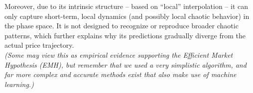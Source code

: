 \begin{itemize}
   Moreover, due to its intrinsic structure -- based on “local” interpolation -- it can only capture short-term, local dynamics (and possibly local chaotic behavior) in the phase space. It is not designed to recognize or reproduce broader chaotic patterns, which further explains why its predictions gradually diverge from the actual price trajectory.\\
   
    \textit{(Some may view this as empirical evidence supporting the Efficient Market Hypothesis (EMH), but remember that we used a very simplistic algorithm, and far more complex and accurate methods exist that also make use of machine learning.)}
\end{itemize}